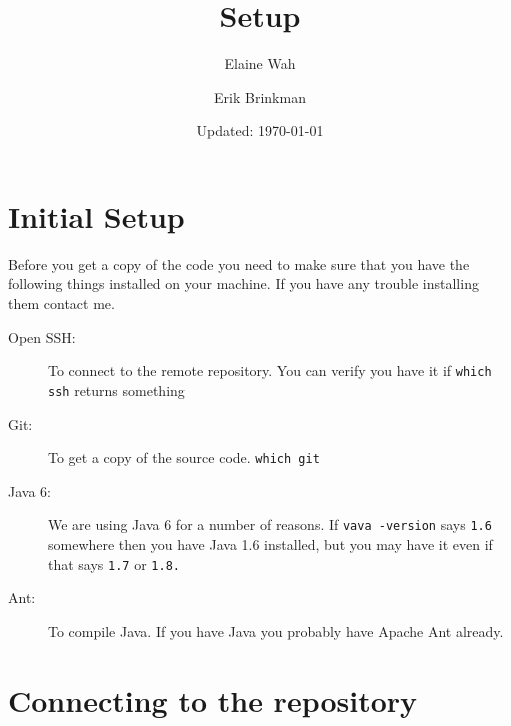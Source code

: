 \documentclass[11pt]{article}
\title{Setup}
\author{
  Elaine Wah \\
  \email{ewah@umich.edu}
  \and
  Erik Brinkman \\
  \email{erik.brinkman@umich.edu}
}
\date{Updated: \today}
\begin{document}
\maketitle

\section{Initial Setup}

Before you get a copy of the code you need to make sure that you have the
following things installed on your machine. If you have any trouble installing
them contact me.

\begin{description}
\item[Open SSH:] To connect to the remote repository. You can verify you have it
  if \texttt{which ssh} returns something
\item[Git:] To get a copy of the source code. \verb|which git|
\item[Java 6:] We are using Java 6 for a number of reasons. If \verb|vava -version| says \verb|1.6| somewhere then you have Java 1.6 installed, but you may
  have it even if that says \verb|1.7| or \verb|1.8.|
\item[Ant:] To compile Java. If you have Java you probably have Apache Ant already.
\end{description}

\section{Connecting to the repository}
\end{document}
